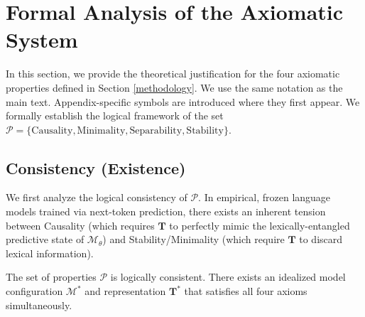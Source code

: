 \section{Formal Analysis of the Axiomatic System}
\label{appendix:theoretical_properties}

In this section, we provide the theoretical justification for the four axiomatic properties defined in Section \ref{methodology}. We use the same notation as the main text. Appendix-specific symbols are introduced where they first appear. We formally establish the logical framework of the set $\mathcal{P} = \{\text{Causality}, \text{Minimality}, \text{Separability}, \text{Stability}\}$.

\subsection{Consistency (Existence)}
\label{app:consistency}

We first analyze the logical consistency of $\mathcal{P}$. In empirical, frozen language models trained via next-token prediction, there exists an inherent tension between Causality (which requires $\mathbf{T}$ to perfectly mimic the lexically-entangled predictive state of $\mathcal{M}_\theta$) and Stability/Minimality (which require $\mathbf{T}$ to discard lexical information). 

\begin{proposition}
The set of properties $\mathcal{P}$ is logically consistent. There exists an idealized model configuration $\mathcal{M}^*$ and representation $\mathbf{T}^*$ that satisfies all four axioms simultaneously.
\end{proposition}

